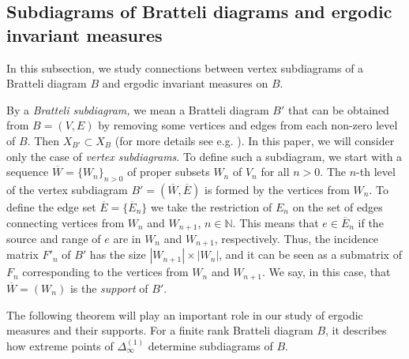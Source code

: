 \documentclass[11pt, english, reqno]{amsart}
\theoremstyle{definition}
\theoremstyle{remark}
\theoremstyle{plain}
\newtheorem{thm}[defin]{Theorem}
\def\ol{\overline}
\def\ov{\overline}
\numberwithin{equation}{section}
\begin{document}
{\subsection{Subdiagrams of Bratteli diagrams and ergodic invariant
 measures}
In this subsection, we study  connections between vertex subdiagrams
of a Bratteli diagram $B$ and  ergodic invariant measures on $B$.

By a \textit{Bratteli subdiagram,} we mean a Bratteli diagram $B'$ that can
be obtained from
$B = (V, E)$ by removing some vertices and edges from each non-zero level of $B$.
 Then  $X_{B'} \subset X_B$ (for more details see e.g.
  \cite{AdamskaBezuglyiKarpelKwiatkowski2016}). In this paper, we will
  consider only the case of \emph{vertex subdiagrams}. To define such a
  subdiagram,  we start with a sequence $\overline W = \{W_n\}_{n>0}$
 of proper subsets $W_n$ of $V_n$ for all $n > 0$. The
 $n$-th level of the vertex subdiagram $B' =  (\ol W, \ol E)$ is formed  by
the vertices from $W_n$. To define the edge set  $\ov E =\{\ov E_n\}$
we take the restriction of $E_n$ on the set of edges connecting vertices
 from  $W_{n}$ and   $W_{n+1}$, $n \in \mathbb N$. This means that
 $e \in \ov E_n$ if the source and range of $e$ are
 in $W_{n}$ and $W_{n+1}$, respectively. Thus, the incidence  matrix
 $F'_n$ of $B'$ has the size $|W_{n+1}| \times |W_n|$, and  it can be seen
 as a submatrix of  $F_n$  corresponding to the
 vertices from $W_{n}$ and $W_{n+1}$. We say, in this case, that $\ol W
  = (W_n)$   is the \textit{support} of $B'$.

%
%

The following theorem will play an important role in our study of ergodic
measures and their supports. For a finite rank Bratteli diagram $B$, it
 describes how extreme points of $\Delta_{\infty}^{(1)}$ determine 
 subdiagrams of $B$.

}
\end{document}
